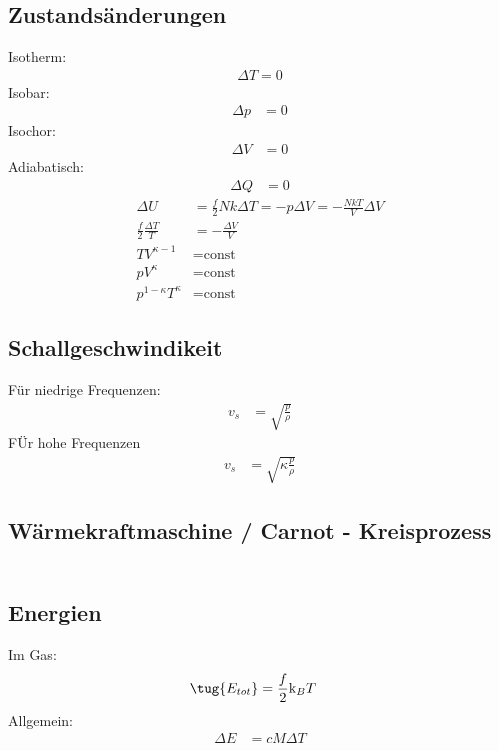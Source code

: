 \documentclass[twocolumn]{summery_3.1}
\begin{document}
\subsection{Zustandsänderungen}
{
    Isotherm:
    {
        \begin{align*}
            \Delta T = 0
        \end{align*}
    }
    Isobar:
    {
        \begin{align*}
            \Delta p &= 0
        \end{align*}
    }
    Isochor:
    {
        \begin{align*}
            \Delta V &= 0 
        \end{align*}
    }
    Adiabatisch:
    {
        \begin{align*}
            \Delta Q &= 0
        \end{align*}
        \begin{align*}
            \Delta U &= \frac{f}{2} N k \Delta T = -p \Delta V = -\frac{N k T }{V} \Delta V\\
            \frac{f}{2} \frac{\Delta T}{T} &= - \frac{\Delta V }{V}\\
             T V ^{\kappa -1} &=  \text{const}\\
            p V ^{\kappa } &=  \text{const}\\
            p^{1-\kappa} T ^{\kappa} &=  \text{const}
        \end{align*}
    }
}

\subsection{Schallgeschwindikeit}
{
    Für niedrige Frequenzen:
    \begin{align*}
        v_s &= \sqrt{\frac{p}{\rho}}
    \end{align*}
    FÜr hohe Frequenzen
    \begin{align*}
        v_s &= \sqrt{\kappa \frac{p}{\rho}}
    \end{align*}
}

\subsection{Wärmekraftmaschine / Carnot - Kreisprozess}
{
    \begin{align*}
    \end{align*}
}

\subsection{Energien}
{
    Im Gas:
    \begin{align*}
        \tug{E_{tot}} &= \frac{f}{2}\mathrm{k}_B T
    \end{align*}
    Allgemein:
    \begin{align*}
        \Delta  E &= c M\Delta T
    \end{align*}

}
\end{document}
